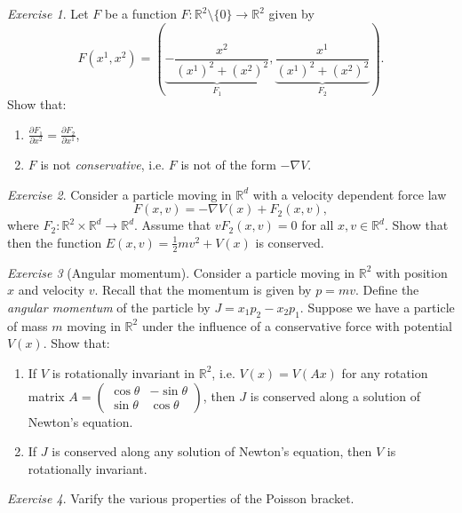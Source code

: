 \documentclass[11pt]{amsart}
\numberwithin{equation}{section}
\theoremstyle{plain}
\theoremstyle{definition}
\theoremstyle{remark}
\newtheorem{exe}{Exercise}[subsection]
\newcommand{\R}{\mathbb{R}}
\begin{document}
\begin{exe}
Let $F$ be a function $F\colon \R^2\setminus\{0\}\to \R^2$ given by $$F(x^1,x^2)=\left(\underbrace{-\frac{x^2}{(x^1)^2+(x^2)^2}}_{F_1},\underbrace{\frac{x^1}{(x^1)^2+(x^2)^2}}_{F_2}\right).$$
Show that: 
\begin{enumerate}
\item{$\frac{\partial F_1}{\partial x^2}=\frac{\partial F_2}{\partial x^1}$,
}
\item{$F$ is not \emph{conservative}, i.e. $F$ is not of the form $-\nabla V$.}
\end{enumerate}
\end{exe}

\begin{exe}
Consider a particle moving in $\R^d$ with a velocity dependent force law $$F(x,v)=-\nabla V(x)+F_2(x,v),$$ where $F_2\colon\R^2\times\R^d\to\R^d$. Assume that $vF_2(x,v)=0$ for all $x,v\in\R^d$. Show that then the function $E(x,v)=\frac{1}{2}mv^2+V(x)$ is conserved.
\end{exe}

\begin{exe}[Angular momentum]
Consider a particle moving in $\R^2$ with position $x$ and velocity $v$. Recall that the momentum is given by $p=mv$. Define the \emph{angular momentum} of the particle by $J=x_1p_2-x_2p_1$. Suppose we have a particle of mass $m$ moving in $\R^2$ under the influence of a conservative force with potential $V(x)$. Show that:
\begin{enumerate}
\item{If $V$ is rotationally invariant in $\R^2$, i.e. $V(x)=V(Ax)$ for any rotation matrix $A=\begin{pmatrix}\cos\theta&-\sin\theta\\ \sin\theta&\cos\theta\end{pmatrix}$, then $J$ is conserved along a solution of Newton's equation.
}
\item{If $J$ is conserved along any solution of Newton's equation, then $V$ is rotationally invariant.
}
\end{enumerate}
\end{exe}

\begin{exe}
Varify the various properties of the Poisson bracket.
\end{exe}
\end{document}
